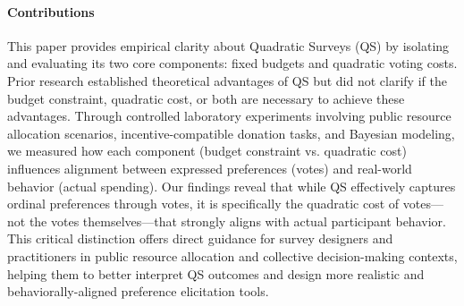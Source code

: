 \paragraph{Contributions} This paper provides empirical clarity about Quadratic Surveys (QS) by isolating and evaluating its two core components: fixed budgets and quadratic voting costs. Prior research established theoretical advantages of QS but did not clarify if the budget constraint, quadratic cost, or both are necessary to achieve these advantages. Through controlled laboratory experiments involving public resource allocation scenarios, incentive-compatible donation tasks, and Bayesian modeling, we measured how each component (budget constraint vs. quadratic cost) influences alignment between expressed preferences (votes) and real-world behavior (actual spending). Our findings reveal that while QS effectively captures ordinal preferences through votes, it is specifically the quadratic cost of votes—not the votes themselves—that strongly aligns with actual participant behavior. This critical distinction offers direct guidance for survey designers and practitioners in public resource allocation and collective decision-making contexts, helping them to better interpret QS outcomes and design more realistic and behaviorally-aligned preference elicitation tools.


